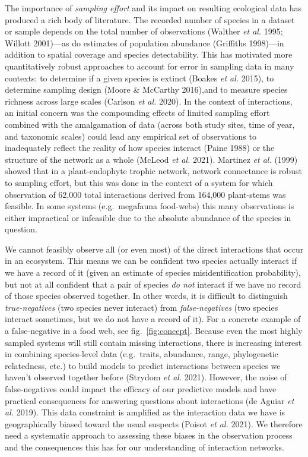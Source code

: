 \documentclass[11pt]{article}
\begin{document}
The importance of \emph{sampling effort} and its impact on resulting
ecological data has produced a rich body of literature. The recorded
number of species in a dataset or sample depends on the total number of
observations (Walther \emph{et al.} 1995; Willott 2001)---as do
estimates of population abundance (Griffiths 1998)---in addition to
spatial coverage and species detectability. This has motivated more
quantitatively robust approaches to account for error in sampling data
in many contexts: to determine if a given species is extinct (Boakes
\emph{et al.} 2015), to determine sampling design (Moore \& McCarthy
2016),and to measure species richness across large scales (Carlson
\emph{et al.} 2020). In the context of interactions, an initial concern
was the compounding effects of limited sampling effort combined with the
amalgamation of data (across both study sites, time of year, and
taxonomic scales) could lead any empirical set of observations to
inadequately reflect the reality of how species interact (Paine 1988) or
the structure of the network as a whole (McLeod \emph{et al.} 2021).
Martinez \emph{et al.} (1999) showed that in a plant-endophyte trophic
network, network connectance is robust to sampling effort, but this was
done in the context of a system for which observation of 62,000 total
interactions derived from 164,000 plant-stems was feasible. In some
systems (e.g.~megafauna food-webs) this many observations is either
impractical or infeasible due to the absolute abundance of the species
in question.

We cannot feasibly observe all (or even most) of the direct interactions
that occur in an ecosystem. This means we can be confident two species
actually interact if we have a record of it (given an estimate of
species misidentification probability), but not at all confident that a
pair of species \emph{do not} interact if we have no record of those
species observed together. In other words, it is difficult to
distinguish \emph{true-negatives} (two species never interact) from
\emph{false-negatives} (two species interact sometimes, but we do not
have a record of it). For a concrete example of a false-negative in a
food web, see fig.~\ref{fig:concept}. Because even the most highly
sampled systems will still contain missing interactions, there is
increasing interest in combining species-level data (e.g.~traits,
abundance, range, phylogenetic relatedness, etc.) to build models to
predict interactions between species we haven't observed together before
(Strydom \emph{et al.} 2021). However, the noise of false-negatives
could impact the efficacy of our predictive models and have practical
consequences for answering questions about interactions (de Aguiar
\emph{et al.} 2019). This data constraint is amplified as the
interaction data we have is geographically biased toward the usual
suspects (Poisot \emph{et al.} 2021). We therefore need a systematic
approach to assessing these biases in the observation process and the
consequences this has for our understanding of interaction networks.
\end{document}
